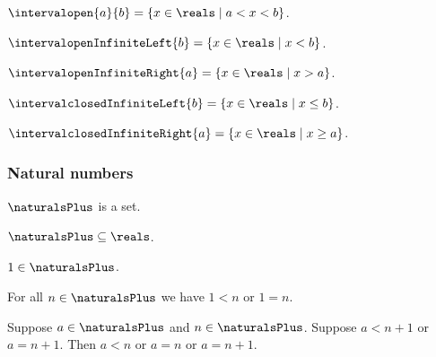 \begin{definition}\label{intervalopen}
    $\intervalopen{a}{b} = \{ x \in \reals \mid a < x < b\}$.
\end{definition}

\begin{definition}\label{intervalopen_infinite_left}
    $\intervalopenInfiniteLeft{b} = \{ x \in \reals \mid x < b\}$.
\end{definition}

\begin{definition}\label{intervalopen_infinite_right}
    $\intervalopenInfiniteRight{a} = \{ x \in \reals \mid x > a\}$.
\end{definition}

\begin{definition}\label{intervalclosed_infinite_left}
    $\intervalclosedInfiniteLeft{b} = \{ x \in \reals \mid x \leq b\}$.
\end{definition}

\begin{definition}\label{intervalclosed_infinite_right}
    $\intervalclosedInfiniteRight{a} = \{ x \in \reals \mid x \geq a\}$.
\end{definition}

\subsubsection{Natural numbers}

\begin{signature} \label{sig2}
    $\naturalsPlus$ is a set.
\end{signature}

\begin{axiom}\label{real_naturals_subset_reals}
    $\naturalsPlus \subseteq \reals$.
\end{axiom}

\begin{axiom}\label{real_one_in_naturals}
    $1\in\naturalsPlus$.
\end{axiom}


\begin{axiom}\label{real_one_leq_naturalsplus}
    For all $n\in\naturalsPlus$ we have $1 < n$ or $1 = n$.
\end{axiom}

\begin{axiom}\label{real_succ_discrete}
    Suppose $a\in\naturalsPlus$ and $n\in\naturalsPlus$.
    Suppose $a < n + 1$ or $a = n + 1$.
    Then $a < n$ or $a = n$ or $a = n + 1$.
\end{axiom}

